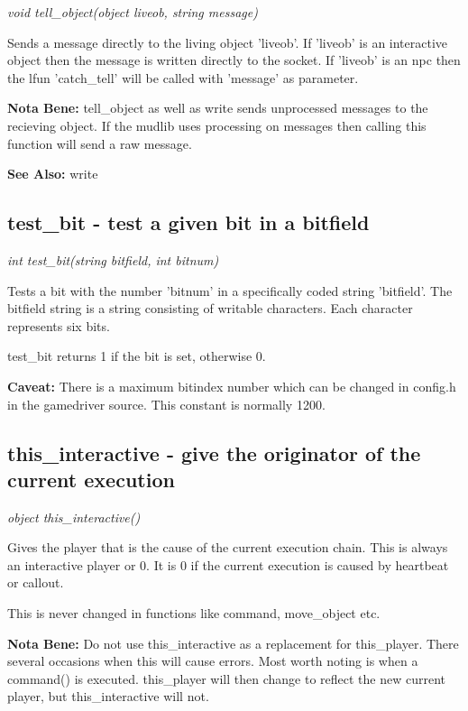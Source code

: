     {\em void tell\_object(object liveob, string message)}

    Sends a message directly to the living object 'liveob'. If 'liveob'
    is an interactive object then the message is written directly to
    the socket. If 'liveob' is an npc then the lfun 'catch\_tell' will
    be called with 'message' as parameter.

    {\bf Nota Bene: }   tell\_object as well as write sends unprocessed messages to the
    recieving object. If the mudlib uses processing on messages
    then calling this function will send a raw message.

    {\bf See Also: }    write


\subsection{test\_bit - test a given bit in a bitfield}

    {\em int test\_bit(string bitfield, int bitnum)}

    Tests a bit with the number 'bitnum' in a specifically coded string
    'bitfield'. The bitfield string is a string consisting of writable
    characters. Each character represents six bits.

    test\_bit returns 1 if the bit is set, otherwise 0.

    {\bf Caveat: }  There is a maximum bitindex number which can be changed in config.h
    in the gamedriver source. This constant is normally 1200.



\subsection{this\_interactive - give the originator of the current execution}

    {\em object this\_interactive()}

    Gives the player that is the cause of the current execution chain.
    This is always an interactive player or 0. It is 0 if the current
    execution is caused by heartbeat or callout.

    This is never changed in functions like command, move\_object etc.

    {\bf Nota Bene: }   Do not use this\_interactive as a replacement for this\_player. There
    several occasions when this will cause errors. Most worth noting
    is when a command() is executed. this\_player will then change to 
    reflect the new current player, but this\_interactive will not. 

